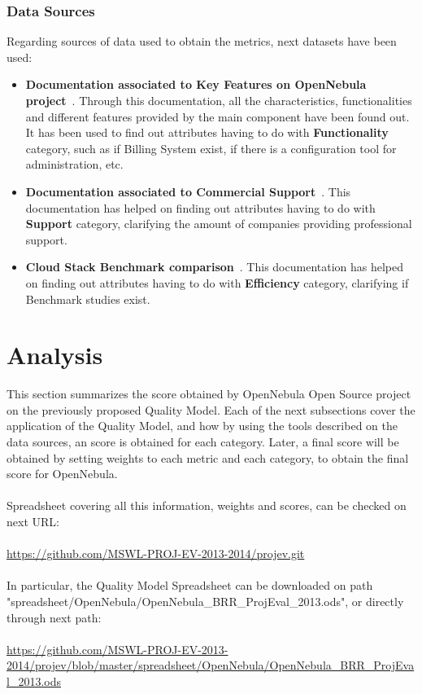 \documentclass[11pt]{article}
\begin{document}
\subsubsection{Data Sources}
Regarding sources of data used to obtain the metrics, next datasets have been used:
\begin{itemize}\itemsep0pt
\item{\textbf{Documentation associated to Key Features on OpenNebula project}~\cite{OPNEB00}}. Through this documentation, all the characteristics, functionalities and different features provided by the main component have been found out. It has been used to find out attributes having to do with \textbf{Functionality} category, such as if Billing System exist, if there is a configuration tool for administration, etc.
\item{\textbf{Documentation associated to Commercial Support}~\cite{OPNEB01}}. This documentation has helped on finding out attributes having to do with \textbf{Support} category, clarifying the amount of companies providing professional support.
\item{\textbf{Cloud Stack Benchmark comparison}~\cite{BENCH00}}. This documentation has helped on finding out attributes having to do with \textbf{Efficiency} category, clarifying if Benchmark studies exist.
\end{itemize}

\section{Analysis} \label{sec:analysis}

This section summarizes the score obtained by OpenNebula Open Source project on the previously proposed Quality Model. Each of the next subsections cover the application of the Quality Model, and how by using the tools described on the data sources, an score is obtained for each category. Later, a final score will be obtained by setting weights to each metric and each category, to obtain the final score for OpenNebula.\\
\\
Spreadsheet covering all this information, weights and scores, can be checked on next URL:\\
\\
\url{https://github.com/MSWL-PROJ-EV-2013-2014/projev.git}\\
\\
In particular, the Quality Model Spreadsheet can be downloaded on path "spreadsheet/OpenNebula/OpenNebula\_BRR\_ProjEval\_2013.ods", or directly through next path:\\
\\
\url{https://github.com/MSWL-PROJ-EV-2013-2014/projev/blob/master/spreadsheet/OpenNebula/OpenNebula\_BRR\_ProjEval\_2013.ods}
\end{document}
